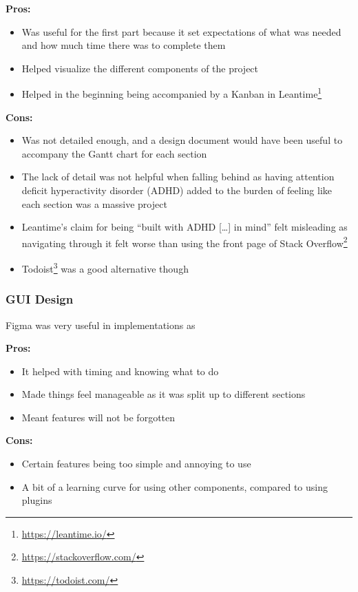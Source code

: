 \documentclass[../dissertation.tex]{subfiles}
\begin{document}
\textbf{Pros:}
\begin{itemize}
  \item Was useful for the first part because it set expectations
    of what was needed and how much time there was to complete them
  \item Helped visualize the different components of the project
  \item Helped in the beginning being accompanied by a Kanban in Leantime\footnote{\url{https://leantime.io/}}
\end{itemize}

\textbf{Cons:}
\begin{itemize}
  \item Was not detailed enough, and a design document would have been useful
    to accompany the Gantt chart for each section
  \item The lack of detail was not helpful when falling behind as having
    attention deficit hyperactivity disorder (ADHD) 
    added to the burden of feeling like each section was a massive project
  \item Leantime's claim for being \enquote{built with ADHD [\ldots] in mind}
    felt misleading as navigating through it felt worse than using the front page
    of Stack Overflow\footnote{\url{https://stackoverflow.com/}}
  \item Todoist\footnote{\url{https://todoist.com/}} was a good alternative though
\end{itemize}

\subsubsection{GUI Design}
Figma was very useful in implementations as

\textbf{Pros:}
\begin{itemize}
  \item It helped with timing and knowing what to do
  \item Made things feel manageable as it was split up to different sections
  \item Meant features will not be forgotten
\end{itemize}

\textbf{Cons:}
\begin{itemize}
  \item Certain features being too simple and annoying to use
  \item A bit of a learning curve for using other components, compared
    to using plugins
\end{itemize}
\end{document}
